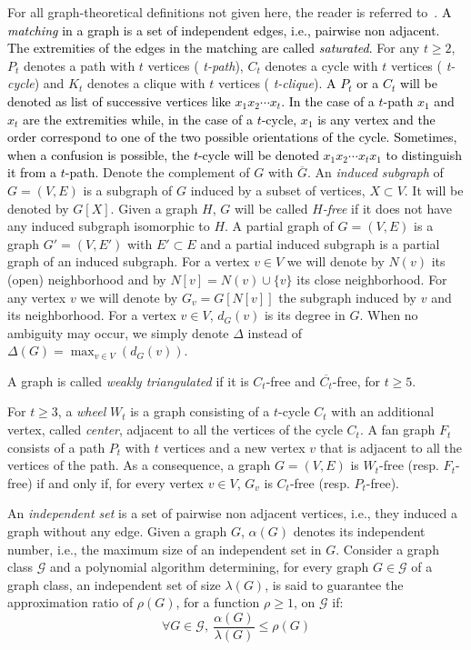 \documentclass[final]{dmtcs-episciences}
\newcommand\mar[1]{\textcolor{black}{#1}}
\begin{document}
For all graph-theoretical definitions not given here, the reader is referred to~\citet{golumbicbook}. \mar{A  \emph{ matching} in a graph is a set of independent edges, i.e., pairwise non adjacent. The extremities of the edges in the matching are called  \emph{ saturated}.}
For any $t\geq 2$, $P_t$ denotes a path with $t$ vertices ( \emph{ t-path}), $C_t$ denotes a  cycle with $t$ vertices ( \emph{ t-cycle}) and $K_t$ denotes a clique with $t$ vertices ( \emph{ t-clique}). \mar{A $P_t$ or a $C_t$ will be denoted as list of successive vertices like $x_1x_2\cdots x_t$. In the case of a $t$-path $x_1$ and $x_t$ are the extremities while, in the case of a $t$-cycle, $x_1$ is any vertex and the order correspond to one of the two possible orientations of the cycle. Sometimes, when a confusion is possible, the $t$-cycle will be denoted $x_1x_2\cdots x_tx_1$ to distinguish it from a $t$-path.}
Denote the complement of $G$ with $\overline{G}$. An  \emph{ induced subgraph} of $G=(V,E)$ is a subgraph of $G$ induced by a subset of vertices, $X\subset V$. It will be denoted by $G[X]$. Given a graph $H$, $G$ will be called {\em $H$-free} if it does not have any induced subgraph isomorphic to $H$. A partial graph of $G=(V,E)$ is a graph $G'=(V,E')$ with $E'\subset E$ and a partial induced subgraph is a partial graph of an induced subgraph. For a vertex $v\in V$ we will denote by $N(v)$ its (open) neighborhood and by $N[v]=N(v)\cup\{v\}$ its close neighborhood. For any vertex $v$ we will denote by $G_v=G[N[v]]$ the subgraph induced by $v$ and its neighborhood. For a vertex $v\in V$, $d_G(v)$ is its degree in $G$. When no ambiguity may occur, we simply denote $\Delta$ instead of $\Delta(G)=\max_{v\in V}(d_G(v))$.

A graph is called {\em weakly triangulated} if it is $C_t$-free and $\overline{C_t}$-free, for $t\geq 5$.


For $t\geq 3$, a {\em wheel} $W_t$ is a graph consisting of a $t$-cycle $C_t$ with an additional vertex, called {\em center}, adjacent to all the vertices of the  cycle $C_t$. A fan graph $F_t$ consists of a path $P_t$ with $t$ vertices and a new vertex $v$ 
that is adjacent to all the vertices of the path. As a consequence, a graph $G=(V,E)$ is $W_t$-free (resp. $F_t$-free) if and only if, for every vertex $v\in V$, $G_v$ is $C_t$-free (resp. $P_t$-free).

An {\em independent set} is a set of  pairwise non adjacent vertices, i.e., they induced a graph without any edge. 
 Given a graph $G$, $\alpha(G)$ denotes its independent number, i.e., the maximum size of an independent set in $G$. Consider a graph class $\mathcal{G}$ and a polynomial algorithm 
 determining, for every graph $G\in \mathcal{G}$ of a graph class, an independent set of size $\lambda(G)$, is said to guarantee the approximation ratio of $\rho(G)$, for a function $\rho\geq 1$, on $\mathcal{G}$ if:
 $$\forall G\in \mathcal{G},\  \frac{\alpha(G)}{\lambda(G)}\leq \rho(G)$$
 
\end{document}
